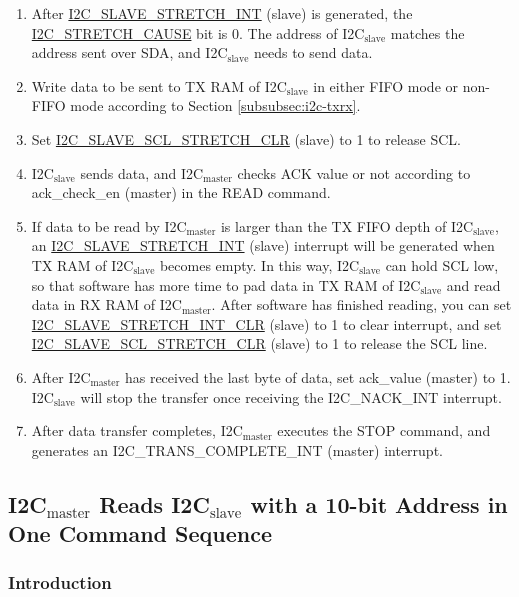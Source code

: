 \documentclass[main\_\_EN.tex]{subfiles}
\begin{document}
\begin{enumerate}
\item After \hyperref[int:i2c-slave-stretch]{I2C\_SLAVE\_STRETCH\_INT} (slave) is generated, the \hyperref[fielddesc:I2CSTRETCHCAUSE]{I2C\_STRETCH\_CAUSE} bit is 0. The address of I2C$_\text{slave}$ matches the address sent over SDA, and I2C$_\text{slave}$ needs to send data.
\item Write data to be sent to TX RAM of I2C$_\text{slave}$ in either FIFO mode or non-FIFO mode according to Section \ref{subsubsec:i2c-txrx}.
\item Set \hyperref[fielddesc:I2CSLAVESCLSTRETCHCLR]{I2C\_SLAVE\_SCL\_STRETCH\_CLR} (slave) to 1 to release SCL.
\item I2C$_\text{slave}$ sends data, and I2C$_\text{master}$ checks ACK value or not according to ack\_check\_en (master) in the READ command.
\item If data to be read by I2C$_\text{master}$ is larger than the TX FIFO depth of I2C$_\text{slave}$, an \hyperref[int:i2c-slave-stretch]{I2C\_SLAVE\_STRETCH\_INT} (slave) interrupt will be generated when TX RAM of I2C$_\text{slave}$ becomes empty. In this way, I2C$_\text{slave}$ can hold SCL low, so that software has more time to pad data in TX RAM of I2C$_\text{slave}$ and read data in RX RAM of I2C$_\text{master}$. After software has finished reading, you can set \hyperref[fielddesc:I2CSLAVESTRETCHINTCLR]{I2C\_SLAVE\_STRETCH\_INT\_CLR} (slave) to 1 to clear interrupt, and set \hyperref[fielddesc:I2CSLAVESCLSTRETCHCLR]{I2C\_SLAVE\_SCL\_STRETCH\_CLR} (slave) to 1 to release the SCL line.
\item After I2C$_\text{master}$ has received the last byte of data, set ack\_value (master) to 1. I2C$_\text{slave}$ will stop the transfer once receiving the I2C\_NACK\_INT interrupt.
\item After data transfer completes, I2C$_\text{master}$ executes the STOP command, and generates an I2C\_TRANS\_COMPLETE\_INT (master) interrupt.
\end{enumerate}

\subsection{\texorpdfstring{I2C$_\text{master}$ Reads I2C$_\text{slave}$ with a 10-bit Address in One Command Sequence}{I2C master Reads I2C slave with a 10-bit Address in One Command Sequence}}

\subsubsection{Introduction}
\end{document}
